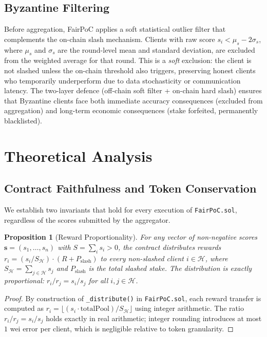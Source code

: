 \documentclass[journal]{IEEEtran}
\newtheorem{proposition}[theorem]{Proposition}
\theoremstyle{definition}
\theoremstyle{remark}
\begin{document}
\subsection{Byzantine Filtering}

Before aggregation, FairPoC applies a soft statistical outlier
filter that complements the on-chain slash mechanism.
Clients with raw score $s_i < \mu_s - 2\sigma_s$, where $\mu_s$
and $\sigma_s$ are the round-level mean and standard deviation, are
excluded from the weighted average for that round.
This is a \emph{soft} exclusion: the client is not slashed unless
the on-chain threshold also triggers, preserving honest clients who
temporarily underperform due to data stochasticity or communication
latency.
The two-layer defence (off-chain soft filter + on-chain hard slash)
ensures that Byzantine clients face both immediate accuracy
consequences (excluded from aggregation) and long-term economic
consequences (stake forfeited, permanently blacklisted).

\section{Theoretical Analysis}
\label{sec:theory}

\subsection{Contract Faithfulness and Token Conservation}

We establish two invariants that hold for every execution of
\texttt{FairPoC.sol}, regardless of the scores submitted by the
aggregator.

\begin{proposition}[Reward Proportionality]
\label{prop:proportionality}
For any vector of non-negative scores $\mathbf{s} = (s_1,\ldots,s_n)$
with $S = \sum_i s_i > 0$, the contract distributes rewards
$r_i = (s_i / S_{\mathcal{H}}) \cdot (R + P_{\mathrm{slash}})$
to every non-slashed client $i \in \mathcal{H}$, where
$S_{\mathcal{H}} = \sum_{j \in \mathcal{H}} s_j$ and
$P_{\mathrm{slash}}$ is the total slashed stake.
The distribution is exactly proportional: $r_i / r_j = s_i / s_j$
for all $i,j \in \mathcal{H}$.
\end{proposition}
\begin{proof}
By construction of \texttt{\_distribute()} in \texttt{FairPoC.sol},
each reward transfer is computed as
$r_i = \lfloor(s_i \cdot \text{totalPool}) / S_{\mathcal{H}}\rfloor$
using integer arithmetic.
The ratio $r_i / r_j = s_i / s_j$ holds exactly in real arithmetic;
integer rounding introduces at most $1$ wei error per client, which
is negligible relative to token granularity.
\end{proof}
\end{document}
